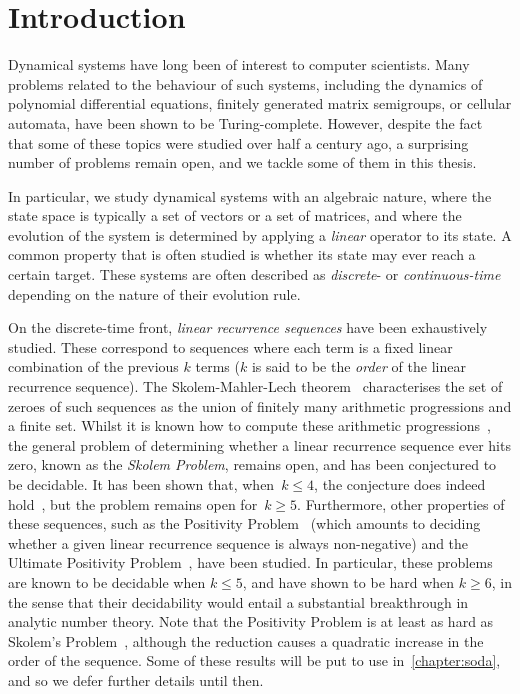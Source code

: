 \chapter{Introduction}
\label{sec:introduction}

Dynamical systems have long been of interest to computer scientists. Many problems related to the behaviour of such systems, including the dynamics of polynomial differential equations, finitely generated matrix semigroups, or cellular automata, have been shown to be Turing-complete. However, despite the fact that some of these topics were studied over half a century ago, a surprising number of problems remain open, and we tackle some of them in this thesis.

In particular, we study dynamical systems with an algebraic nature, where the state space is typically a set of vectors or a set of matrices, and where the evolution of the system is determined by applying a \emph{linear} operator to its state. A common property that is often studied is whether its state may ever reach a certain target. These systems are often described as \emph{discrete}- or \emph{continuous-time} depending on the nature of their evolution rule.

On the discrete-time front, \emph{linear recurrence sequences} have been exhaustively studied. These correspond to sequences where each term is a fixed linear combination of the previous $k$ terms ($k$ is said to be the \emph{order} of the linear recurrence sequence). The Skolem-Mahler-Lech theorem~\cite{Sko34,Mah35,Lec53,Hansel85} characterises the set of zeroes of such sequences as the union of finitely many arithmetic progressions and a finite set. Whilst it is known how to compute these
arithmetic progressions~\cite{BM76}, the general problem of determining whether a linear recurrence sequence ever hits zero, known as the \emph{Skolem Problem}, remains open, and has been conjectured to be decidable. It has been shown that, when~$k \leq 4$, the conjecture does indeed hold~\cite{Ver85}, but the problem remains open for~$k\geq 5$.
Furthermore, other properties of these sequences, such as the Positivity Problem~\cite{Bell2007,HHH06,LT09,OW13:constructive-positivity,OW14:SODA,Liu10} (which amounts to deciding whether a given linear recurrence sequence is always non-negative) and the Ultimate Positivity Problem~\cite{OuaknineW13b}, have been studied.
In particular, these problems are known to be decidable when $k \leq 5$, and have shown to be hard when $k \geq 6$, in the sense that their decidability would entail a substantial breakthrough in analytic number theory. Note that the Positivity Problem is at least as hard as Skolem's Problem~\cite{OW14:SODA}, although the reduction causes a quadratic increase in the order of the sequence. Some of these results will be put to use in~\cref{chapter:soda}, and so we defer further details until then.

